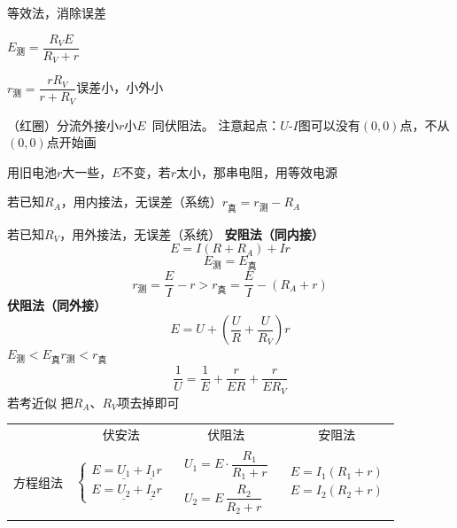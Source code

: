 等效法，消除误差

$E_{\text{测}}=\dfrac{R_VE}{R_V+r}$

$r_{\text{测}}=\dfrac{rR_V}{r+R_V}$\qquad 误差小，小外小

（红圈）分流外接小$r$小$E$\ 同伏阻法。
注意起点：$U$-$I$图可以没有$(0,0)$点，不从$(0,0)$点开始画

用旧电池$r$大一些，$E$不变，若$r$太小，那串电阻，用等效电源

若已知$R_A$，用内接法，无误差（系统）\qquad $r_{\text{真}}=r_{\text{测}}-R_A$

若已知$R_V$，用外接法，无误差（系统）
\textbf{安阻法（同内接）}
\[
E=I(R+R_A)+Ir
\]
\[
E_{\text{测}}=E_{\text{真}}
\]
\[
r_{\text{测}}=\frac{E}{I}-r>r_{\text{真}}=\frac{E}{I}-(R_A+r)
\]
\textbf{伏阻法（同外接）}
\[
E=U+\left(\frac{U}{R}+\frac{U}{R_V}\right)r
\]
$E_{\text{测}}<E_{\text{真}}$\qquad $r_{\text{测}}<r_{\text{真}}$
\[
\frac{1}{U}=\frac{1}{E}+\frac{r}{ER}+\frac{r}{ER_V}
\]
若考近似 把$R_A$、$R_V$项去掉即可
\begin{center}
\renewcommand{\arraystretch}{1.6}
\begin{tabular}{@{}c c c c@{}}
 & 伏安法 & 伏阻法 & 安阻法\\
方程组法 &
$\left\{\begin{array}{l} E=\underline{U_1}+\underline{I_1}r\\ E=\underline{U_2}+\underline{I_2}r\end{array}\right.$ &
$\begin{array}{l} U_1=E\cdot\dfrac{R_1}{R_1+r}\\[6pt] U_2=E\,\dfrac{R_2}{R_2+r}\end{array}$ &
$\begin{array}{l} E=I_1(R_1+r)\\ E=I_2(R_2+r)\end{array}$
\end{tabular}
\end{center}

